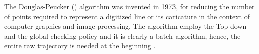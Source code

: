 

The Douglas-Peucker (\dpa) algorithm \cite{Douglas:Peucker} was invented in 1973, for reducing the number of points required to represent a digitized line or its caricature in the context of computer graphics and image processing.
The \dpa algorithm employ the Top-down and the global checking policy and it is clearly a batch algorithm, hence, the entire raw trajectory is needed at the beginning \cite{Meratnia:Spatiotemporal}.


